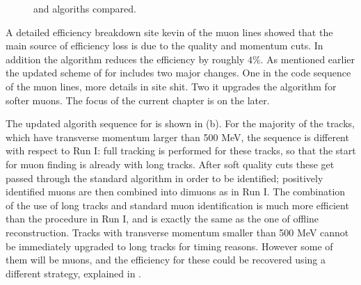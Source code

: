 \begin{figure}[h!]
  \centering
  \scalebox{1}{}
  \scalebox{1}{}
 \caption{ \runone and \runtwo \hltone algoriths compared. }
  \label{hlt1_algo_seq}
\end{figure}

A detailed efficiency breakdown{\color{red} site kevin} of the \runone \hltone muon lines showed that the main source of efficiency
loss is due to the quality and momentum cuts. In addition the \mvm algorithm reduces the efficiency by roughly $4\%$.
As mentioned earlier the updated scheme of \hltone for \runtwo includes two major changes. One in the code sequence of the
\hltone muon lines, more details in {\color{red} site shit}. Two it upgrades the \mvm algorithm for softer muons. The focus of the current chapter is on the later.

The updated \hltone algorith sequence for \runtwo is shown in (b).
For the majority of the tracks, which have transverse momentum larger than 500 MeV, the sequence is different with respect to
Run I: full tracking is performed for these tracks, so that the start for muon finding is already with long tracks.
After soft quality cuts these get passed through the standard \isMuon algorithm in order to be identified;
positively identified muons are then combined into dimuons as in Run I.
The combination of the use of long tracks and standard muon identification is much more efficient than the
procedure in Run I, and is exactly the same as the one of offline reconstruction.
Tracks with transverse momentum smaller than 500 MeV cannot be immediately upgraded to long tracks for timing reasons.
However some of them will be muons, and the efficiency for these could be recovered using a different strategy,
explained in .
